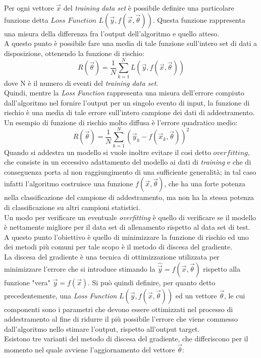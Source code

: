 Per ogni vettore $\vec{x}$ del \textit{training data set} è possibile definire una particolare funzione detta $\textit{Loss Function}$ $L(\vec{y},f(\vec{x},\vec{\theta}))$. Questa funzione rappresenta una misura della differenza fra l'output dell'algoritmo e quello atteso.\\ 
A questo punto è possibile fare una media di tale funzione sull'intero set di dati a disposizione, ottenendo la funzione di rischio: \\
\begin{equation}
R(\vec{\theta}) = \frac{1}{N}\sum_{k=1}^{N}L(\vec{y},f(\vec{x},\vec{\theta}))
\end{equation}
dove N è il numero di eventi del \textit{training data set}. \\
Quindi, mentre la \textit{Loss Function} rappresenta una misura dell'errore compiuto dall'algoritmo nel fornire l'output per un singolo evento di input, la funzione di rischio è una media di tale errore sull'intero campione dei dati di addestramento.\\
Un esempio di funzione di rischio molto diffusa è l'errore quadratico medio:
\begin{equation}
R(\vec{\theta}) = \frac{1}{N}\sum_{k=1}^{N}(\vec{y}_k - f(\vec{x}_k , \vec{\theta}))^2
\end{equation}
Quando si addestra un modello si vuole inoltre evitare il così detto $\textit{overfitting}$, che consiste in un eccessivo adattamento del modello ai dati di \textit{training} e che di conseguenza porta al non raggiungimento di una sufficiente generalità; in tal caso infatti l'algoritmo costruisce una funzione $f(\vec{x},\vec{\theta})$, che ha una forte potenza nella classificazione del campione di addestramento, ma non ha la stessa potenza di classificazione su altri campioni statistici. \\
Un modo per verificare un eventuale \textit{overfitting} è quello di verificare se il modello è nettamente migliore per il data set di allenamento rispetto al data set di test. \\
A questo punto l'obiettivo è quello di minimizzare la funzione di rischio ed uno dei metodi più comuni per tale scopo è il metodo di discesa del gradiente.\\
La discesa del gradiente è una tecnica di ottimizzazione utilizzata per minimizzare l'errore che si introduce stimando la $\hat{\vec{y}} = f(\vec{x},\vec{\theta})$ rispetto alla funzione "vera" $\vec{y} = f(\vec{x})$. Si può quindi definire, per quanto detto precedentemente, una \textit{Loss Function} $L(\vec{y},f(\vec{x},\vec{\theta}))$ ed un vettore $\vec{\theta}$, le cui componenti sono i parametri che devono essere ottimizzati nel processo di addestramento al fine di ridurre il più possibile l'errore che viene commesso dall'algoritmo nello stimare l'output, rispetto all'output target.\\
Esistono tre varianti del metodo di discesa del gradiente, che differiscono per il momento nel quale avviene l'aggiornamento del vettore $\vec{\theta}$:

